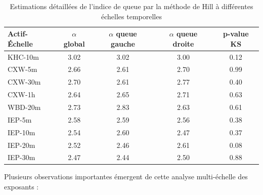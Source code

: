 \documentclass[10pt,a4paper]{article}
\theoremstyle{definition}
\theoremstyle{remark}
\begin{document}
\begin{table}[H]
\centering
\begin{tabular}{lcccc}
\toprule
Actif-Échelle & $\alpha$ global & $\alpha$ queue gauche & $\alpha$ queue droite & p-value KS \\
\midrule
KHC-10m & 3.02 & 3.02 & 3.00 & 0.12 \\
\midrule
CXW-5m & 2.66 & 2.61 & 2.70 & 0.99 \\
CXW-30m & 2.70 & 2.61 & 2.77 & 0.40 \\
CXW-1h & 2.64 & 2.65 & 2.71 & 0.63 \\
\midrule
WBD-20m & 2.73 & 2.83 & 2.63 & 0.61 \\
\midrule
IEP-5m & 2.58 & 2.59 & 2.56 & 0.38 \\
IEP-10m & 2.54 & 2.60 & 2.47 & 0.37 \\
IEP-20m & 2.52 & 2.46 & 2.61 & 0.08 \\
IEP-30m & 2.47 & 2.44 & 2.50 & 0.88 \\
\bottomrule
\end{tabular}
\caption{Estimations détaillées de l'indice de queue par la méthode de Hill à différentes échelles temporelles}
\label{tab:hill_detail_moved}
\end{table}

Plusieurs observations importantes émergent de cette analyse multi-échelle des exposants :
\end{document}
